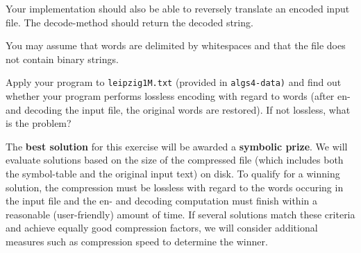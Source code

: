 \documentclass[11pt]{article}
\begin{document}
Your implementation should also be able to reversely translate an encoded input file. The decode-method should return the decoded string.

You may assume that words are delimited by whitespaces and that the file does not contain binary strings.

Apply your program to \texttt{leipzig1M.txt} (provided in \texttt{algs4-data)} and find out whether your program performs lossless encoding with regard to words (after en- and decoding the input file, the original words are restored). If not lossless, what is the problem?


The \textbf{best solution} for this exercise will be awarded a \textbf{symbolic prize}.
We will evaluate solutions based on the size of the compressed file (which includes both the symbol-table and the original input text) on disk.
To qualify for a winning solution, the compression must be lossless with regard to the words occuring in the input file and the en- and decoding computation must finish within a reasonable (user-friendly) amount of time.
If several solutions match these criteria and achieve equally good compression factors, we will consider additional measures such as compression speed to determine the winner.
\end{document}

